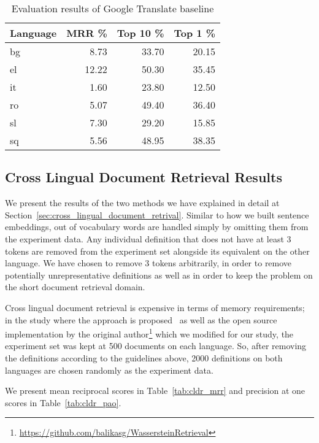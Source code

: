 \begin{table}[htbp]
    \centering
    \begin{tabulary}{1.0\linewidth}{L R R R}
        \toprule
        \textbf{Language} & \textbf{MRR \%} & \textbf{Top 10 \%} & \textbf{Top 1 \%} \\ \midrule
        bg & 8.73 & 33.70 & 20.15 \\
        el & 12.22 & 50.30 & 35.45 \\
        it & 1.60 & 23.80 & 12.50 \\
        ro & 5.07 & 49.40 & 36.40 \\
        sl & 7.30 & 29.20 & 15.85 \\
        sq & 5.56 & 48.95 & 38.35 \\ \bottomrule
    \end{tabulary}
    \caption{Evaluation results of Google Translate baseline}%
    \label{tab:google_translate_baseline}
\end{table}

\subsection{Cross Lingual Document Retrieval Results}%
\label{sub:cross_lingual_retrieval_results}

We present the results of the two methods we have explained in detail at Section~\ref{sec:cross_lingual_document_retrival}.
Similar to how we built sentence embeddings, out of vocabulary words are handled simply by omitting them from the experiment data.
Any individual definition that does not have at least 3 tokens are removed from the experiment set alongside its equivalent on the other language.
We have chosen to remove 3 tokens arbitrarily, in order to remove potentially unrepresentative definitions as well as in order to keep the problem on the short document retrieval domain.

Cross lingual document retrieval is expensive in terms of memory requirements; in the study where the approach is proposed~\cite{balikasCrosslingual2018} as well as the open source implementation by the original author\footnote{\url{https://github.com/balikasg/WassersteinRetrieval}} which we modified for our study, the experiment set was kept at 500 documents on each language.
So, after removing the definitions according to the guidelines above, 2000 definitions on both languages are chosen randomly as the experiment data.

We present mean reciprocal scores in Table~\ref{tab:cldr_mrr} and precision at one scores in Table~\ref{tab:cldr_pao}.

